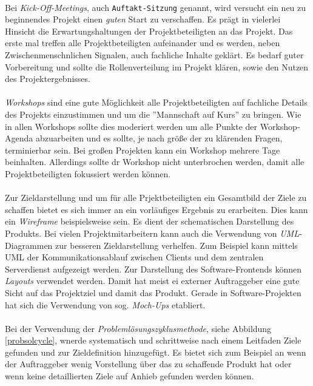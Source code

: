 \documentclass[12pt]{scrartcl}
\begin{document}
\ \\
Bei \textit{Kick-Off-Meetings}, auch \texttt{Auftakt-Sitzung} genannt, wird versucht ein neu zu beginnendes Projekt einen \textit{guten} Start zu verschaffen. Es prägt in vielerlei Hinsicht die Erwartungshaltungen der Projektbeteiligten an das Projekt. Das erste mal treffen alle Projektbeteiligten aufeinander und es werden, neben Zwischenmenschnlichen Signalen, auch fachliche Inhalte geklärt. Es bedarf guter Vorbereitung und sollte die Rollenverteilung im Projekt klären, sowie den Nutzen des Projektergebnisses. \\
\\
\textit{Workshops} sind eine gute Möglichkeit alle Projektbeteiligten auf fachliche Details des Projekts einzustimmen und um die ''Mannschaft auf Kurs'' zu bringen. Wie in allen Workshops sollte dies moderiert werden um alle Punkte der Workshop-Agenda abzuarbeiten und es sollte, je nach größe der zu klärenden Fragen, terminierbar sein. Bei großen Projekten kann ein Workshop mehrere Tage beinhalten. Allerdings sollte dr Workshop nicht unterbrochen werden, damit alle Projektbeteiligten fokussiert werden können. \\
\\
Zur Zieldarstellung und um für alle Prjektbeteiligten ein Gesamtbild der Ziele zu schaffen bietet es sich immer an ein vorläufiges Ergebnis zu erarbeiten. Dies kann ein \textit{Wireframe} beispielsweise sein. Es dient der schematischen Darstellung des Produkts. Bei vielen Projektmitarbeitern kann auch die Verwendung von \textit{UML}-Diagrammen zur besseren Zieldarstellung verhelfen. Zum Beispiel kann mittels UML der Kommunikationsablauf zwischen Clients und dem zentralen Serverdienst aufgezeigt werden. Zur Darstellung des Software-Frontends können \textit{Layouts} verwendet werden. Damit hat meist ei externer Auftraggeber eine gute Sicht auf das Projektziel und damit das Produkt. Gerade in Software-Projekten hat sich die Verwendung von sog. \textit{Moch-Ups} etabliert. \\
\\
Bei der Verwendung der \textit{Problemlösungszyklusmethode}, siehe Abbildung \ref{probsolcycle}, wnerde systematisch und schrittweise nach einem Leitfaden Ziele gefunden und zur Zieldefinition hinzugefügt. Es bietet sich zum Beispiel an wenn der Auftraggeber wenig Vorstellung über das zu schaffende Produkt hat oder wenn keine detaillierten Ziele auf Anhieb gefunden werden können. 
\end{document}
